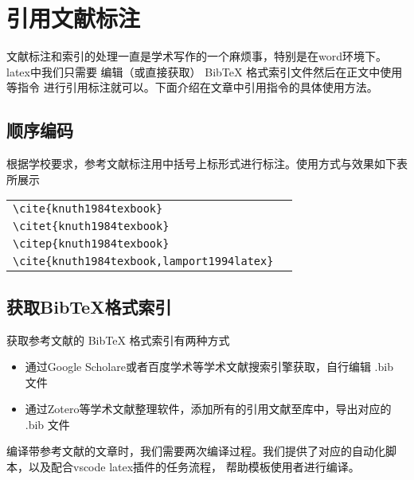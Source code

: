 \chapter{引用文献标注}

文献标注和索引的处理一直是学术写作的一个麻烦事，特别是在word环境下。latex中我们只需要
编辑（或直接获取） BibTeX 格式索引文件然后在正文中使用 等指令
进行引用标注就可以。下面介绍在文章中引用指令的具体使用方法。

\section{顺序编码}

根据学校要求，参考文献标注用中括号上标形式进行标注。使用方式与效果如下表所展示

\begin{tabular}{l@{\quad$\Rightarrow$\quad}l}
    \verb|\cite{knuth1984texbook}|               & \cite{knuth1984texbook}               \\
    \verb|\citet{knuth1984texbook}|              & \citet{knuth1984texbook}              \\
    \verb|\citep{knuth1984texbook}|              & \citep{knuth1984texbook}              \\
    \verb|\cite{knuth1984texbook,lamport1994latex}| & \cite{knuth1984texbook,lamport1994latex} \\
\end{tabular}

\section{获取BibTeX格式索引}

获取参考文献的 BibTeX 格式索引有两种方式

\begin{itemize}
    \item 通过Google Scholare或者百度学术等学术文献搜索引擎获取，自行编辑 .bib 文件
    \item 通过Zotero等学术文献整理软件，添加所有的引用文献至库中，导出对应的 .bib 文件
\end{itemize}

编译带参考文献的文章时，我们需要两次编译过程。我们提供了对应的自动化脚本，以及配合vscode latex插件的任务流程，
帮助模板使用者进行编译。




